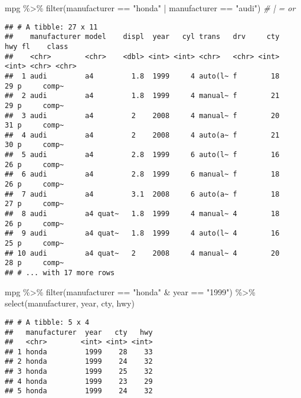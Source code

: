\documentclass[
]{article}
\newenvironment{Shaded}{\begin{snugshade}}{\end{snugshade}}
\newcommand{\CommentTok}[1]{\textcolor[rgb]{0.56,0.35,0.01}{\textit{#1}}}
\newcommand{\FunctionTok}[1]{\textcolor[rgb]{0.00,0.00,0.00}{#1}}
\newcommand{\NormalTok}[1]{#1}
\newcommand{\SpecialCharTok}[1]{\textcolor[rgb]{0.00,0.00,0.00}{#1}}
\newcommand{\StringTok}[1]{\textcolor[rgb]{0.31,0.60,0.02}{#1}}
\begin{document}
\begin{Shaded}
\begin{Highlighting}[]
\NormalTok{mpg }\SpecialCharTok{\%\textgreater{}\%}
  \FunctionTok{filter}\NormalTok{(manufacturer }\SpecialCharTok{==} \StringTok{"honda"} \SpecialCharTok{|}\NormalTok{ manufacturer }\SpecialCharTok{==} \StringTok{"audi"}\NormalTok{)  }\CommentTok{\# | = \textquotesingle{}or\textquotesingle{}}
\end{Highlighting}
\end{Shaded}

\begin{verbatim}
## # A tibble: 27 x 11
##    manufacturer model    displ  year   cyl trans   drv     cty   hwy fl    class
##    <chr>        <chr>    <dbl> <int> <int> <chr>   <chr> <int> <int> <chr> <chr>
##  1 audi         a4         1.8  1999     4 auto(l~ f        18    29 p     comp~
##  2 audi         a4         1.8  1999     4 manual~ f        21    29 p     comp~
##  3 audi         a4         2    2008     4 manual~ f        20    31 p     comp~
##  4 audi         a4         2    2008     4 auto(a~ f        21    30 p     comp~
##  5 audi         a4         2.8  1999     6 auto(l~ f        16    26 p     comp~
##  6 audi         a4         2.8  1999     6 manual~ f        18    26 p     comp~
##  7 audi         a4         3.1  2008     6 auto(a~ f        18    27 p     comp~
##  8 audi         a4 quat~   1.8  1999     4 manual~ 4        18    26 p     comp~
##  9 audi         a4 quat~   1.8  1999     4 auto(l~ 4        16    25 p     comp~
## 10 audi         a4 quat~   2    2008     4 manual~ 4        20    28 p     comp~
## # ... with 17 more rows
\end{verbatim}

\begin{Shaded}
\begin{Highlighting}[]
\NormalTok{mpg }\SpecialCharTok{\%\textgreater{}\%}
  \FunctionTok{filter}\NormalTok{(manufacturer }\SpecialCharTok{==} \StringTok{"honda"} \SpecialCharTok{\&}\NormalTok{ year }\SpecialCharTok{==} \StringTok{"1999"}\NormalTok{) }\SpecialCharTok{\%\textgreater{}\%}
  \FunctionTok{select}\NormalTok{(manufacturer, year, cty, hwy)}
\end{Highlighting}
\end{Shaded}

\begin{verbatim}
## # A tibble: 5 x 4
##   manufacturer  year   cty   hwy
##   <chr>        <int> <int> <int>
## 1 honda         1999    28    33
## 2 honda         1999    24    32
## 3 honda         1999    25    32
## 4 honda         1999    23    29
## 5 honda         1999    24    32
\end{verbatim}
\end{document}
